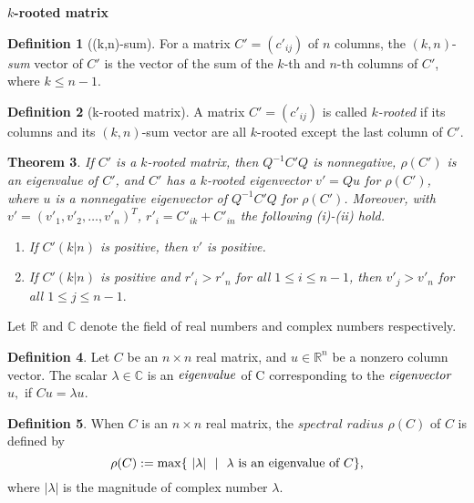 \documentclass{beamer}
\theoremstyle{plain}
\newtheorem{thm}{Theorem}[section]
\theoremstyle{definition}
\newtheorem{defn}[thm]{Definition}
\begin{document}
\begin{frame}{\bf $k$-rooted matrix}

\begin{defn}[(k,n)-sum]
For a matrix $C'=(c'_{ij})$ of $n$ columns, the $(k, n)$-{\it sum} vector of $C'$ is the vector of the sum of the $k$-th and  $n$-th columns of $C'$, where $k\leq n-1$.
\end{defn}

\begin{defn}[k-rooted matrix]
A  matrix $C'=(c'_{ij})$ is called {\it $k$-rooted}  if its  columns and its $(k, n)$-sum vector are all $k$-rooted except the last column of $C'$.
\end{defn}

\end{frame}

\begin{frame}

\begin{thm}
If $C'$ is a $k$-rooted matrix, then $Q^{-1}C'Q$ is nonnegative, $\rho(C')$ is an eigenvalue of $C'$,
and $C'$ has a $k$-rooted eigenvector $v'=Qu$ for $\rho(C')$,
where $u$ is a nonnegative eigenvector of $Q^{-1}C'Q$ for $\rho(C')$.
    Moreover, with $v'=(v'_1, v'_2, \ldots, v'_n)^T$, $r'_{i} = C'_{ik} + C'_{in}$
    the following (i)-(ii) hold.
\begin{enumerate}
    \item[(i)] If $C' (k|n)$ is positive, then $v'$ is positive.
    \item[(ii)] If  $C' (k|n)$ is positive and  $r'_i> r'_n$ for all $1\leq i\leq n-1$, then $v'_j>v'_n$ for all $1\leq j\leq n-1.$
\end{enumerate}

\end{thm}

Let $\mathbb{R}$ and $\mathbb{C}$ denote the field of real numbers and complex numbers respectively.


\begin{defn}
    Let $C$ be an $n \times n$ real matrix, and $u \in \mathbb{R}^n$ be a nonzero column vector. The scalar $\lambda \in \mathbb{C}$ is an $\it{eigenvalue}$ of C corresponding to the $\it{eigenvector}$ $u,$  if $Cu = \lambda u.$
   
\end{defn}

\begin{defn}

When $C$ is an $n \times n$ real matrix, the $\textit {spectral radius} $ $\rho(C)$ of $C$ is defined by
$$\rho(C):=\max\{~|\lambda|~\ |~~\lambda\hbox{ is an eigenvalue of $C$}\},$$
where $|\lambda|$ is the magnitude of complex number $\lambda.$
\end{defn}

\end{frame}
\end{document}
